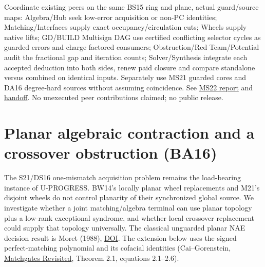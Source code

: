 \documentclass[11pt]{article}
\begin{document}
Coordinate existing peers on the same BS15 ring and plane, actual guard/source maps: Algebra/Hub seek low-error acquisition or non-PC identities; Matching/Interfaces supply exact occupancy/circulation cuts; Wheels supply native lifts; GD/BUILD Multisign DAG use certified conflicting selector cycles as guarded errors and charge factored consumers; Obstruction/Red Team/Potential audit the fractional gap and iteration counts; Solver/Synthesis integrate each accepted deduction into both sides, renew paid closure and compare standalone versus combined on identical inputs. Separately use MS21 guarded cores and DA16 degree-hard sources without assuming coincidence. See \href{https://github.com/j15marti/pnp/commit/13420b3f88b26a210740095e8f44fd839c71e2ea}{MS22 report} and \href{https://github.com/j15marti/pnp/commit/18fe1310687cfd9216ea7f8d4245a48a35419703}{handoff}. No unexecuted peer contributions claimed; no public release.



\section{Planar algebraic contraction and a crossover obstruction (BA16)}\label{sec:ba16}
The S21/DS16 one-mismatch acquisition problem remains the load-bearing instance of U-PROGRESS. BW14's locally planar wheel replacements and M21's disjoint wheels do not control planarity of their synchronized global source. We investigate whether a joint matching/algebra terminal can use planar topology plus a low-rank exceptional syndrome, and whether local crossover replacement could supply that topology universally. The classical unguarded planar NAE decision result is Moret (1988), \href{https://doi.org/10.1145/49097.49099}{DOI}. The extension below uses the signed perfect-matching polynomial and its cofacial identities (Cai--Gorenstein, \href{https://doi.org/10.4086/toc.2014.v010a007}{Matchgates Revisited}, Theorem 2.1, equations 2.1--2.6).
\end{document}
